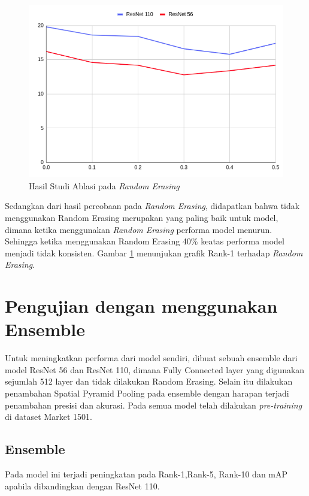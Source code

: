 \begin{figure} [!htb]
	\centering
	\includegraphics[scale=0.35]{img/HasilRandomErasing.png}
	\caption{Hasil Studi Ablasi pada \textit{Random Erasing}}
	\label{fig: rerasing}
\end{figure}

Sedangkan dari hasil percobaan pada \textit{Random Erasing}, didapatkan bahwa tidak menggunakan Random Erasing merupakan yang paling baik untuk model, dimana ketika menggunakan \textit{Random Erasing} performa model menurun. Sehingga ketika menggunakan Random Erasing 40\% keatas performa model menjadi tidak konsisten. Gambar \ref{fig: rerasing} menunjukan grafik Rank-1 terhadap \textit{Random Erasing}.

\section{Pengujian dengan menggunakan Ensemble}
\vspace{1ex}
Untuk meningkatkan performa dari model sendiri, dibuat sebuah ensemble dari model ResNet 56 dan ResNet 110, dimana Fully Connected layer yang digunakan sejumlah 512 layer dan tidak dilakukan Random Erasing. Selain itu dilakukan penambahan Spatial Pyramid Pooling pada ensemble dengan harapan terjadi penambahan presisi dan akurasi. Pada semua model telah dilakukan \textit{pre-training} di dataset Market 1501.

\subsection{Ensemble}
\vspace{1ex}
Pada model ini terjadi peningkatan pada Rank-1,Rank-5, Rank-10 dan mAP apabila dibandingkan dengan ResNet 110.
 
